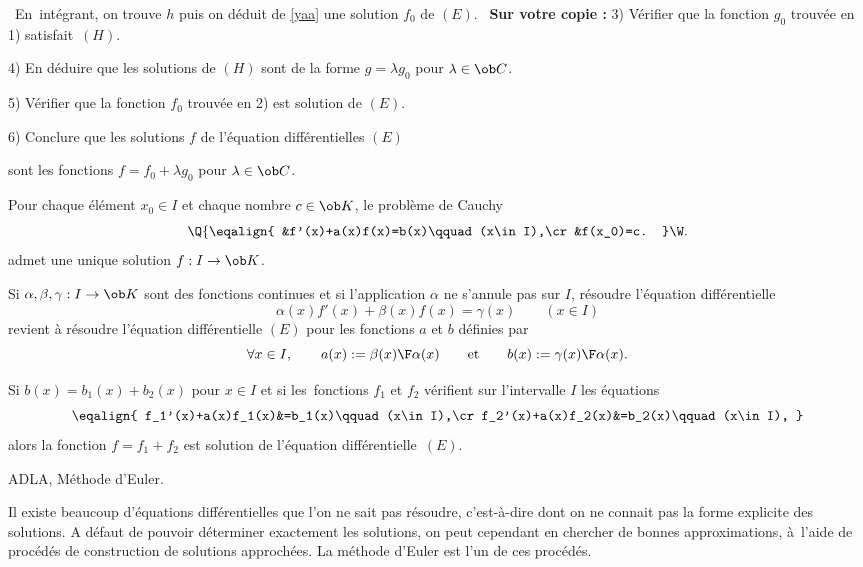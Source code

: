 \noindent\ En~intégrant, on trouve $h$ puis on déduit de \eqref{yaa} une solution $f_0$ de $(E)$. \medskip
\noindent\quad\ {\bf Sur votre copie : } 3) Vérifier que la fonction $g_0$ trouvée en 1) satisfait~$(H)$. 
\medskip
\centerline{4) En déduire que les solutions de $(H)$ sont de la forme $g=\lambda g_0$ pour $\lambda\in\ob C$. }
\medskip

\centerline{5) Vérifier que la fonction $f_0$ trouvée en 2) est solution de $(E)$. \qquad}
\medskip

\centerline{6) Conclure que les solutions $f$ de l'équation différentielles $(E)$}\centerline{sont les fonctions $f=f_0+\lambda g_0$ pour $\lambda\in \ob C$. }
\bigskip
\noindent
Pour chaque élément $x_0\in I$ et chaque nombre $c\in\ob K$, le problème de Cauchy
$$
\Q\{\eqalign{
&f'(x)+a(x)f(x)=b(x)\qquad(x\in I),\cr
&f(x_0)=c.
}\W.
$$
admet une unique solution $f:I\to\ob K$.
\bigskip

 Si $\alpha,\beta,\gamma:I\to\ob K$ sont des fonctions continues et si l'application $\alpha$ ne s'annule pas sur $I$, résoudre l'équation différentielle 
$$
\alpha(x)f'(x)+\beta(x)f(x)=\gamma(x)\qquad (x\in I)
$$
revient à résoudre l'équation différentielle $(E)$ pour les fonctions $a$ et $b$ définies par 
$$ 
\forall x\in I, \qquad a(x):={\beta(x)\F\alpha(x)}\qquad\mbox{et}\qquad b(x):={\gamma(x)\F\alpha(x)}.
$$

 Si $b(x)=b_1(x)+b_2(x)$ pour $x\in I$ et si les~fonctions $f_1$ et $f_2$ vérifient sur l'intervalle $I$ les équations 
$$
\eqalign{
f_1'(x)+a(x)f_1(x)&=b_1(x)\qquad(x\in I),\cr
f_2'(x)+a(x)f_2(x)&=b_2(x)\qquad(x\in I),
}
$$ 
alors la fonction $f=f_1+f_2$ est solution de l'équation différentielle~$(E)$. 

\Section ADLA, Méthode d'Euler.


Il existe beaucoup d'équations différentielles que l'on ne sait pas résoudre, c'est-à-dire dont on ne connait pas la forme explicite des solutions. 
A défaut de pouvoir déterminer exactement les solutions, on peut cependant en chercher de bonnes approximations, à~l'aide de procédés de construction de solutions approchées. 
La méthode d'Euler est l'un de ces procédés. \bigskip


